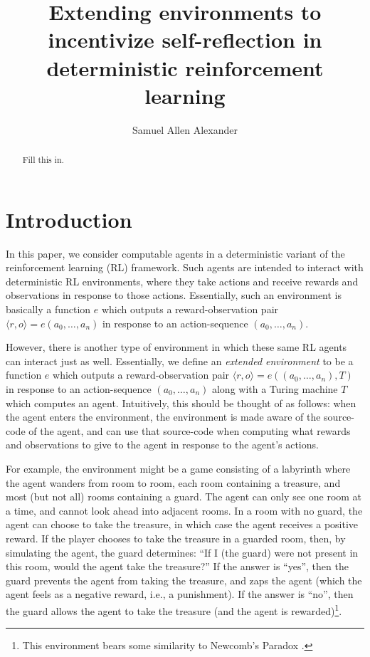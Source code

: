 \documentclass[runningheads]{llncs}
\begin{document}
\title{Extending environments to incentivize self-reflection
in deterministic reinforcement learning}

\author{Samuel Allen Alexander}

\maketitle

\begin{abstract}
    Fill this in.
\end{abstract}

\section{Introduction}

In this paper, we consider computable agents in a deterministic variant of the reinforcement
learning (RL) framework. Such agents are intended to interact with deterministic RL
environments, where they take actions and receive rewards and observations in
response to those actions. Essentially, such an environment is basically a function $e$
which outputs a reward-observation pair
$\langle r,o\rangle=e(a_0,\ldots,a_n)$ in response to an action-sequence $(a_0,\ldots,a_n)$.

However, there is another type of environment in which these
same RL agents can interact just as well. Essentially, we define an \emph{extended
environment} to be a function $e$ which outputs a reward-observation pair
$\langle r,o\rangle=e((a_0,\ldots,a_n), T)$ in response to an action-sequence
$(a_0,\ldots,a_n)$ along with a Turing machine $T$ which computes an agent.
Intuitively, this should be thought of as follows: when the agent enters the environment,
the environment is made aware of the source-code of the agent, and can use that
source-code when computing what rewards and observations to give to the agent in response
to the agent's actions.

For example, the environment might be a game consisting of a
labyrinth where the agent wanders from
room to room, each room containing a treasure, and most (but not all) rooms containing
a guard. The agent can only see one room at a time, and cannot look ahead into adjacent
rooms. In a room with no guard, the agent can choose to take the treasure, in which
case the agent receives a positive reward.
If the player chooses to take the treasure in a guarded room,
then, by simulating the agent, the guard determines: ``If
I (the guard) were not present in this room, would the agent take the treasure?''
If the answer is ``yes'', then the guard prevents the agent from taking the treasure,
and zaps the agent (which the agent feels as a negative reward, i.e., a punishment).
If the answer is ``no'', then the guard allows the agent to take the treasure (and the
agent is rewarded)\footnote{This environment bears some similarity to Newcomb's
Paradox \cite{nozick1969newcomb}.}.
\end{document}
